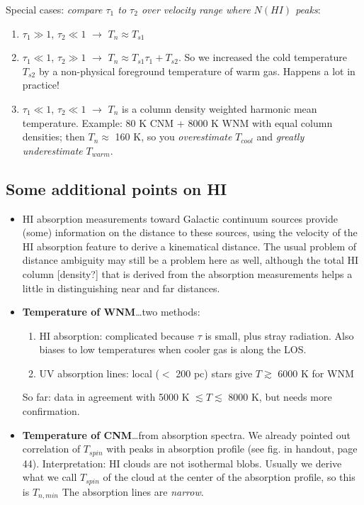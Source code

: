 \documentclass[12pt]{article}
\newcommand{\mar}[1]{\hspace{0pt}\marginpar{-\textcolor{black}{#1}-}}
\newcommand{\mynotes}[1]{{\fontfamily{cmss}\selectfont \textit{#1}}}
\begin{document}
Special cases: \mynotes{compare $\tau_{1}$ to $\tau_{2}$ over velocity range
where $N(HI)$ peaks}:
\begin{enumerate}
    \item $\tau_{1} \gg 1$, $\tau_{2} \ll 1$ $\rightarrow$ $T_{n} \approx T_{s1}$
    \item $\tau_{1} \ll 1$, $\tau_{2} \gg 1$ $\rightarrow$
        $T_{n} \approx T_{s1}\tau_{1} + T_{s2}$. So we increased the cold
        temperature $T_{s2}$ by a non-physical foreground temperature of warm
        gas. Happens a lot in practice!
    \item $\tau_{1} \ll 1$, $\tau_{2} \ll 1$ $\rightarrow$ $T_{n}$ is a
        column density weighted harmonic mean temperature. Example: 80 K CNM +
        8000 K WNM with equal column densities; then $T_{n} \approx$ 160 K,
        so you \emph{overestimate} $T_{cool}$ and \emph{greatly underestimate}
        $T_{warm}$.
\end{enumerate}

\subsection{Some additional points on HI}
\mar{49}
\begin{itemize}
    \item HI absorption measurements toward Galactic continuum sources provide (some)
        information on the distance to these sources, using the velocity of the HI
        absorption feature to derive a kinematical distance. The usual problem of
        distance ambiguity may still be a problem here as well, although the total
        HI column [density?] that is derived from the absorption measurements helps
        a little in distinguishing near and far distances.
    \item \textbf{Temperature of WNM}\ldots two methods:
        \begin{enumerate}
            \item HI absorption: complicated because $\tau$ is small, plus stray
                radiation. Also biases to low temperatures when cooler gas is
                along the LOS\@.
            \item UV absorption lines: local ($<$ 200 pc) stars give
            $T \gtrsim$ 6000 K for WNM
        \end{enumerate}
        So far: data in agreement with 5000 K $\lesssim T \lesssim$ 8000 K,
        but needs more confirmation.
    \item \textbf{Temperature of CNM}\ldots from absorption spectra.
        We already pointed out correlation of $T_{spin}$ with peaks in
        absorption profile (see fig. in handout, page 44). Interpretation: HI
        clouds are not isothermal blobs. Usually we derive what we call
        $T_{spin}$ of the cloud at the center of the absorption profile, so this
        is $T_{n, min}$
        \mar{50}The absorption lines are \emph{narrow}.
\end{itemize}
\end{document}
